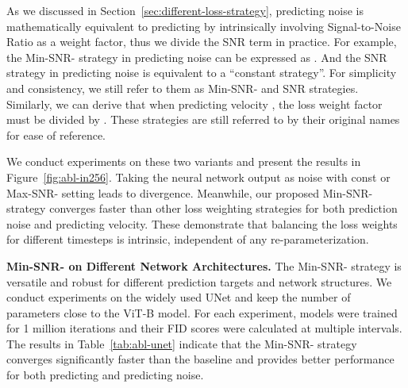 As we discussed in Section~\ref{sec:different-loss-strategy}, predicting noise  is mathematically equivalent to predicting  by intrinsically involving Signal-to-Noise Ratio as a weight factor, thus we divide the SNR term in practice. For example, the Min-SNR- strategy in predicting noise can be expressed as . And the SNR strategy in predicting noise is equivalent to a ``constant strategy''. For simplicity and consistency, we still refer to them as Min-SNR- and SNR strategies. Similarly, we can derive that when predicting velocity , the loss weight factor must be divided by . These strategies are still referred to by their original names for ease of reference.

We conduct experiments on these two variants and present the results in Figure~\ref{fig:abl-in256}. Taking the neural network output as noise with const or Max-SNR- setting leads to divergence. Meanwhile, our proposed Min-SNR- strategy converges faster than other loss weighting strategies for both prediction noise and predicting velocity. These demonstrate that balancing the loss weights for different timesteps is intrinsic, independent of any re-parameterization.









\noindent \textbf{Min-SNR- on Different Network Architectures.}
The Min-SNR- strategy is versatile and robust for different prediction targets and network structures. We conduct experiments on the widely used UNet and keep the number of parameters close to the ViT-B model. For each experiment, models were trained for 1 million iterations and their FID scores were calculated at multiple intervals. The results in Table~\ref{tab:abl-unet} indicate that the Min-SNR- strategy converges significantly faster than the baseline and provides better performance for both predicting  and predicting noise.



